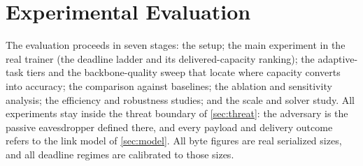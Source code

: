 \documentclass[a4paper,fleqn]{cas-dc}
\begin{document}
\section{Experimental Evaluation}
\label{sec:eval}
The evaluation proceeds in seven stages: the setup; the main experiment in the real trainer (the deadline ladder and its delivered-capacity ranking); the adaptive-task tiers and the backbone-quality sweep that locate where capacity converts into accuracy; the comparison against baselines; the ablation and sensitivity analysis; the efficiency and robustness studies; and the scale and solver study. All experiments stay inside the threat boundary of \cref{sec:threat}: the adversary is the passive eavesdropper defined there, and every payload and delivery outcome refers to the link model of \cref{sec:model}. All byte figures are real serialized sizes, and all deadline regimes are calibrated to those sizes.
\end{document}
